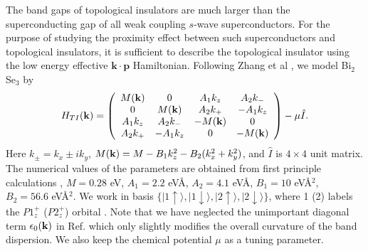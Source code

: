 \documentclass[11pt]{report}
\def\ket#1{\vert #1 \rangle}
\begin{document}
The band gaps of topological insulators are much larger than the superconducting
gap of all  weak coupling $s$-wave superconductors. 
For the purpose of studying the proximity
effect between such superconductors and topological insulators, it is
sufficient to describe the topological insulator using the 
low energy effective $\mathbf{k}\cdot \mathbf{p}$ Hamiltonian. Following
Zhang et al \cite{zhang}, we model Bi$_2$Se$_3$ by 
\begin{eqnarray}
H_{TI}({\bf k})=
\left( \begin{array}{cccc}
M({\bf k}) & 0 & A_1 k_z  & A_2 k_{-} \\
0 &M({\bf k})& A_2 k_+ & -A_1 k_z \\
 A_1 k_z  & A_2 k_{-} &-M({\bf k}) & 0 \\
A_2 k_+ & -A_1 k_z &0 & -M({\bf k}) \\
 \end{array} \right)-\mu \hat{I}.
 \end{eqnarray}
Here $k_{\pm}=k_x \pm i k_y $, 
$M({\bf k})=M-B_1 k_z ^2 - B_2 (k_x^2 + k_y^2)$, and $\hat{I}$ is $4\times 4$
unit matrix. The numerical values of 
the parameters are obtained from first principle calculations \cite{zhang,band}, $M=0.28$ eV,
$A_1=2.2$ eV\AA, $A_2=4.1$ eV\AA, $B_1=10$ eV\AA$^2$, $B_2=56.6 $ eV\AA$^2$.
We work in basis $\{\ket{1\uparrow}, \ket{1\downarrow},\ket{2\uparrow},\ket{2\downarrow} \}$,
where 1 (2) labels the $P1_z^+$ ($P2_z^+$) orbital \cite{zhang}. Note that
we have neglected the unimportant diagonal term $\epsilon_0({\bf k})$ in Ref. \cite{zhang} which 
only slightly modifies the overall curvature of the band dispersion. We also
keep the chemical potential $\mu$ as a tuning parameter.
\end{document}

